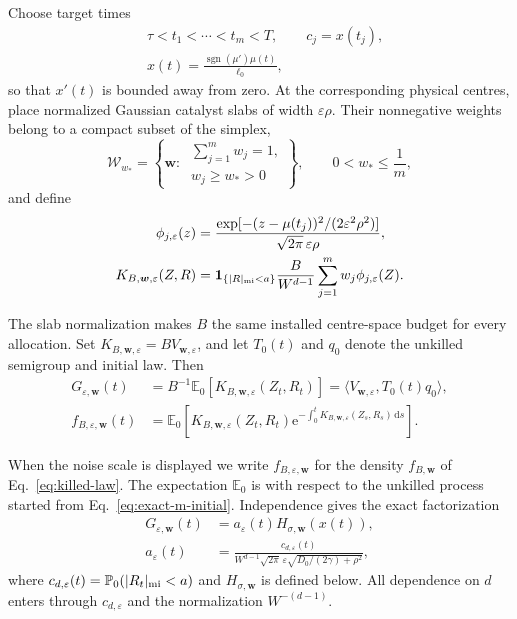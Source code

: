 \documentclass[aps,physrev,reprint,amsmath,amssymb,longbibliography,floatfix]{revtex4-2}
\newcommand{\dd}{\mathrm d}
\newcommand{\e}{\mathrm e}
\begin{document}
Choose target times
\begin{equation}
 \begin{aligned}
  &\tau<t_1<\cdots<t_m<T,\qquad c_j=x(t_j),\\
  &x(t)=\frac{\operatorname{sgn}(\mu')\mu(t)}{\ell_0},
 \end{aligned}
 \label{eq:exact-m-centres}
\end{equation}
so that $x'(t)$ is bounded away from zero.  At the corresponding physical
centres, place normalized Gaussian catalyst slabs of width
$\varepsilon\rho$.  Their nonnegative weights belong to a compact subset of
the simplex,
\begin{equation}
 \mathcal W_{w_*}
 =\left\{\bm w:\
   \substack{\sum_{j=1}^{m}w_j=1,\\ w_j\ge w_*>0}\right\},
 \qquad 0<w_*\le\frac1m,
 \label{eq:exact-m-simplex}
\end{equation}
and define
\begin{equation}
 \begin{aligned}
 \phi_{j,\varepsilon}(z)
 &=\frac{\exp[-(z-\mu(t_j))^2/(2\varepsilon^2\rho^2)]}
        {\sqrt{2\pi}\,\varepsilon\rho},\\
 K_{B,\bm w,\varepsilon}(Z,R)
 &=\bm1_{\{|R|_{\rm mi}<a\}}\frac{B}{W^{d-1}}
   \sum_{j=1}^{m}w_j\phi_{j,\varepsilon}(Z).
 \end{aligned}
 \label{eq:exact-m-killing}
\end{equation}

The slab normalization makes $B$ the same installed centre-space budget for
every allocation.  Set $K_{B,\bm w,\varepsilon}=B V_{\bm w,\varepsilon}$,
and let $T_0(t)$ and $q_0$ denote the unkilled semigroup and initial law.  Then
\begin{equation}
 \begin{aligned}
 G_{\varepsilon,\bm w}(t)
 &=B^{-1}\mathbb E_0[K_{B,\bm w,\varepsilon}(Z_t,R_t)]
 =\langle V_{\bm w,\varepsilon},T_0(t)q_0\rangle,\\
 f_{B,\varepsilon,\bm w}(t)
 &=\mathbb E_0\!\left[K_{B,\bm w,\varepsilon}(Z_t,R_t)
  \e^{-\int_0^tK_{B,\bm w,\varepsilon}(Z_s,R_s)\,\dd s}\right].
 \end{aligned}
 \label{eq:exact-m-observables}
\end{equation}

When the noise scale is displayed we write $f_{B,\varepsilon,\bm w}$ for the
density $f_{B,\bm w}$ of Eq.~\eqref{eq:killed-law}.
The expectation $\mathbb E_0$ is with respect to the unkilled process started
from Eq.~\eqref{eq:exact-m-initial}.  Independence gives the exact
factorization
\begin{align}
 G_{\varepsilon,\bm w}(t)
 &=a_\varepsilon(t)H_{\sigma,\bm w}(x(t)),\nonumber\\
 a_\varepsilon(t)
 &=\frac{c_{d,\varepsilon}(t)}
 {W^{d-1}\sqrt{2\pi}\,\varepsilon
  \sqrt{D_0/(2\gamma)+\rho^2}},
 \label{eq:exact-m-factorization}
\end{align}
where $c_{d,\varepsilon}(t)=
\mathbb P_0(|R_t|_{\rm mi}<a)$ and $H_{\sigma,\bm w}$ is defined below.
All dependence on $d$ enters through $c_{d,\varepsilon}$ and the
normalization $W^{-(d-1)}$.
\end{document}
